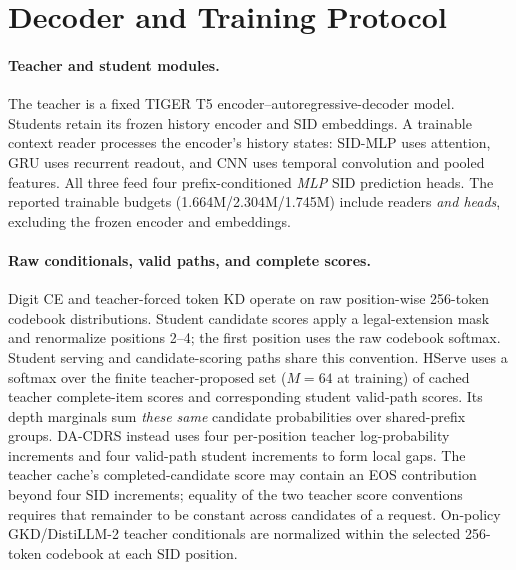 \section{Decoder and Training Protocol}
\label{sec:appendix-protocol}

\paragraph{Teacher and student modules.}
The teacher is a fixed TIGER T5 encoder--autoregressive-decoder model.
Students retain its frozen history encoder and SID embeddings.
A trainable context reader processes the encoder's history states:
SID-MLP uses attention, GRU uses recurrent readout, and CNN uses
temporal convolution and pooled features. All three feed four
prefix-conditioned \emph{MLP} SID prediction heads. The reported
trainable budgets (1.664M/2.304M/1.745M) include readers
\emph{and heads}, excluding the frozen encoder and embeddings.

\paragraph{Raw conditionals, valid paths, and complete scores.}
Digit CE and teacher-forced token KD operate on raw position-wise
256-token codebook distributions. Student candidate scores apply a
legal-extension mask and renormalize positions 2--4; the first
position uses the raw codebook softmax. Student serving and
candidate-scoring paths share this convention. HServe uses a
softmax over the finite teacher-proposed set ($M=64$ at training)
of cached teacher complete-item scores and corresponding student
valid-path scores. Its depth marginals sum \emph{these same}
candidate probabilities over shared-prefix groups.
DA-CDRS instead uses four per-position teacher log-probability
increments and four valid-path student increments to form local
gaps. The teacher cache's completed-candidate score may contain
an EOS contribution beyond four SID increments; equality of
the two teacher score conventions requires that remainder
to be constant across candidates of a request.
On-policy GKD/DistiLLM-2 teacher conditionals are normalized
within the selected 256-token codebook at each SID position.

